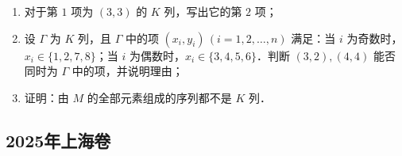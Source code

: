 \begin{description}
\begin{enumerate}[leftmargin=5pt]
        \begin{enumerate}[label=(\arabic*)]
            \item 对于第 $1$ 项为 $(3,3)$ 的 $K$ 列，写出它的第 $2$ 项；
            \item 设 $\Gamma$ 为 $K$ 列，且 $\Gamma$ 中的项 $(x_i,y_i)\,(i=1,2,\dots,n)$ 满足：当 $i$ 为奇数时，$x_i\in\{1,2,7,8\}$；当 $i$ 为偶数时，$x_i\in\{3,4,5,6\}$．判断 $(3,2),(4,4)$ 能否同时为 $\Gamma$ 中的项，并说明理由；
            \item 证明：由 $M$ 的全部元素组成的序列都不是 $K$ 列．
        \end{enumerate}
    \end{enumerate}
\end{description}
\clearpage


\subsection{2025年上海卷}\label{gk:2025年上海卷}

